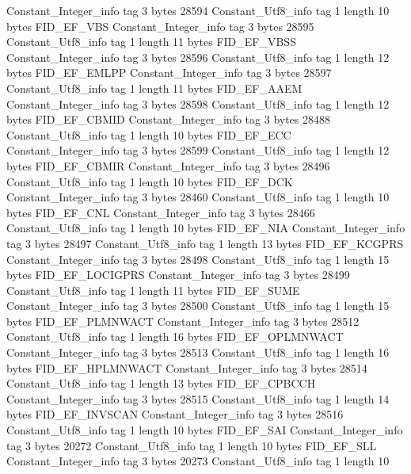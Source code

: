 {{{		}
		Constant_Integer_info {
			tag	3
			bytes	28594
		}
		Constant_Utf8_info {
			tag	1
			length	10
			bytes	FID_EF_VBS
		}
		Constant_Integer_info {
			tag	3
			bytes	28595
		}
		Constant_Utf8_info {
			tag	1
			length	11
			bytes	FID_EF_VBSS
		}
		Constant_Integer_info {
			tag	3
			bytes	28596
		}
		Constant_Utf8_info {
			tag	1
			length	12
			bytes	FID_EF_EMLPP
		}
		Constant_Integer_info {
			tag	3
			bytes	28597
		}
		Constant_Utf8_info {
			tag	1
			length	11
			bytes	FID_EF_AAEM
		}
		Constant_Integer_info {
			tag	3
			bytes	28598
		}
		Constant_Utf8_info {
			tag	1
			length	12
			bytes	FID_EF_CBMID
		}
		Constant_Integer_info {
			tag	3
			bytes	28488
		}
		Constant_Utf8_info {
			tag	1
			length	10
			bytes	FID_EF_ECC
		}
		Constant_Integer_info {
			tag	3
			bytes	28599
		}
		Constant_Utf8_info {
			tag	1
			length	12
			bytes	FID_EF_CBMIR
		}
		Constant_Integer_info {
			tag	3
			bytes	28496
		}
		Constant_Utf8_info {
			tag	1
			length	10
			bytes	FID_EF_DCK
		}
		Constant_Integer_info {
			tag	3
			bytes	28460
		}
		Constant_Utf8_info {
			tag	1
			length	10
			bytes	FID_EF_CNL
		}
		Constant_Integer_info {
			tag	3
			bytes	28466
		}
		Constant_Utf8_info {
			tag	1
			length	10
			bytes	FID_EF_NIA
		}
		Constant_Integer_info {
			tag	3
			bytes	28497
		}
		Constant_Utf8_info {
			tag	1
			length	13
			bytes	FID_EF_KCGPRS
		}
		Constant_Integer_info {
			tag	3
			bytes	28498
		}
		Constant_Utf8_info {
			tag	1
			length	15
			bytes	FID_EF_LOCIGPRS
		}
		Constant_Integer_info {
			tag	3
			bytes	28499
		}
		Constant_Utf8_info {
			tag	1
			length	11
			bytes	FID_EF_SUME
		}
		Constant_Integer_info {
			tag	3
			bytes	28500
		}
		Constant_Utf8_info {
			tag	1
			length	15
			bytes	FID_EF_PLMNWACT
		}
		Constant_Integer_info {
			tag	3
			bytes	28512
		}
		Constant_Utf8_info {
			tag	1
			length	16
			bytes	FID_EF_OPLMNWACT
		}
		Constant_Integer_info {
			tag	3
			bytes	28513
		}
		Constant_Utf8_info {
			tag	1
			length	16
			bytes	FID_EF_HPLMNWACT
		}
		Constant_Integer_info {
			tag	3
			bytes	28514
		}
		Constant_Utf8_info {
			tag	1
			length	13
			bytes	FID_EF_CPBCCH
		}
		Constant_Integer_info {
			tag	3
			bytes	28515
		}
		Constant_Utf8_info {
			tag	1
			length	14
			bytes	FID_EF_INVSCAN
		}
		Constant_Integer_info {
			tag	3
			bytes	28516
		}
		Constant_Utf8_info {
			tag	1
			length	10
			bytes	FID_EF_SAI
		}
		Constant_Integer_info {
			tag	3
			bytes	20272
		}
		Constant_Utf8_info {
			tag	1
			length	10
			bytes	FID_EF_SLL
		}
		Constant_Integer_info {
			tag	3
			bytes	20273
		}
		Constant_Utf8_info {
			tag	1
			length	10
}}}
